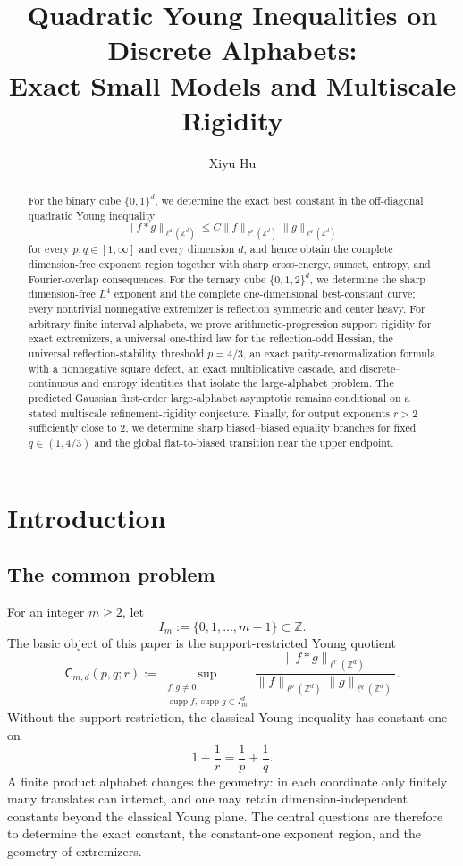 \documentclass[11pt,reqno]{amsart}
\title[Quadratic Young inequalities on discrete alphabets]
{Quadratic Young Inequalities on Discrete Alphabets:\\
Exact Small Models and Multiscale Rigidity}
\author{Xiyu Hu}
\date{}
\numberwithin{equation}{section}
\theoremstyle{definition}
\theoremstyle{remark}
\newcommand{\Z}{\mathbb Z}
\newcommand{\supp}{\operatorname{supp}}
\begin{document}
\begin{abstract}
For the binary cube $\{0,1\}^d$, we determine the exact best constant in the off-diagonal quadratic Young inequality
\[
  \|f*g\|_{\ell^2(\Z^d)}
  \le C\|f\|_{\ell^p(\Z^d)}\|g\|_{\ell^q(\Z^d)}
\]
for every $p,q\in[1,\infty]$ and every dimension $d$, and hence obtain the complete dimension-free exponent region together with sharp cross-energy, sumset, entropy, and Fourier-overlap consequences.  For the ternary cube $\{0,1,2\}^d$, we determine the sharp dimension-free $L^4$ exponent and the complete one-dimensional best-constant curve; every nontrivial nonnegative extremizer is reflection symmetric and center heavy.  For arbitrary finite interval alphabets, we prove arithmetic-progression support rigidity for exact extremizers, a universal one-third law for the reflection-odd Hessian, the universal reflection-stability threshold $p=4/3$, an exact parity-renormalization formula with a nonnegative square defect, an exact multiplicative cascade, and discrete--continuous and entropy identities that isolate the large-alphabet problem.  The predicted Gaussian first-order large-alphabet asymptotic remains conditional on a stated multiscale refinement-rigidity conjecture.  Finally, for output exponents $r>2$ sufficiently close to $2$, we determine sharp biased--biased equality branches for fixed $q\in(1,4/3)$ and the global flat-to-biased transition near the upper endpoint.
\end{abstract}

\maketitle
\tableofcontents
\clearpage

\section{Introduction}\label{sec:introduction}

\subsection{The common problem}
For an integer $m\ge2$, let
\[
  I_m:=\{0,1,\ldots,m-1\}\subset\Z.
\]
The basic object of this paper is the support-restricted Young quotient
\begin{equation}\label{eq:general-sharp-constant}
  \mathsf C_{m,d}(p,q;r)
  :=\sup_{\substack{f,g\ne0\\
       \supp f,\supp g\subset I_m^d}}
  \frac{\|f*g\|_{\ell^r(\Z^d)}}
       {\|f\|_{\ell^p(\Z^d)}\|g\|_{\ell^q(\Z^d)}}.
\end{equation}
Without the support restriction, the classical Young inequality has constant one on
\[
  1+\frac1r=\frac1p+\frac1q.
\]
A finite product alphabet changes the geometry: in each coordinate only finitely many translates can interact, and one may retain dimension-independent constants beyond the classical Young plane.  The central questions are therefore to determine the exact constant, the constant-one exponent region, and the geometry of extremizers.
\end{document}
